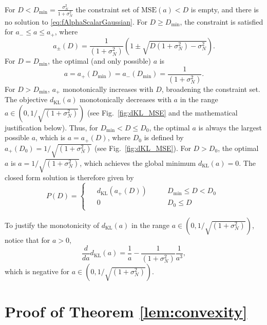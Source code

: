 For $D < D_{\min} = \frac{\sigma_N^2}{1+\sigma_N^2}$ the constraint set of $\text{MSE}(a)<D$ is empty, and there is no solution to \eqref{eq:fAlphaScalarGaussian}. For $D \ge D_{\min}$, the constraint is satisfied for $a_- \le a \le a_+$, where
\begin{equation}\label{eq:constraintSol}
a_{\pm}(D) = \frac{1}{(1 + \sigma_N^2)}\left(1\pm\sqrt{D(1+\sigma_N^2)-\sigma_N^2}\right).
\end{equation}
For $D=D_{\min}$, the optimal (and only possible) $a$ is
\begin{equation}
a = a_+(D_{\min}) = a_-(D_{\min}) =  \frac{1}{(1 + \sigma_N^2)}.
\end{equation}
For $D > D_{\min}$, $a_+$ monotonically increases with $D$, broadening the constraint set. The objective $d_{\text{KL}}(a)$ monotonically decreases with $a$ in the range $a \in (0,1/\sqrt{(1+\sigma_N^2)})$ (see Fig.~\ref{fig:dKL_MSE} and the mathematical justification below). Thus, for $D_{\min} < D \le D_0$, the optimal $a$ is always the largest possible $a$, which is $a=a_+(D)$, where $D_0$ is defined by $a_+(D_0) = 1/\sqrt{(1+\sigma_N^2)}$ (see Fig.~\ref{fig:dKL_MSE}).
For $D>D_0$, the optimal $a$ is $a=1/\sqrt{(1+\sigma_N^2)}$, which achieves the global minimum $d_{\text{KL}}(a)=0$. The closed form solution is therefore given by
\begin{equation}
P(D) =\begin{cases}
\begin{aligned}
&d_{\text{KL}}(a_+(D)) \quad \quad &D_{\min} \le D < D_0\\
&0 &D_0 \le D
\end{aligned}
\end{cases}
\end{equation}

To justify the monotonicity of $d_{\text{KL}}(a)$ in the range $a \in (0,1/\sqrt{(1+\sigma_N^2)})$, notice that for $a > 0$,
\begin{equation}
\frac{d}{da} d_{\text{KL}}(a) = \frac{1}{a} - \frac{1}{(1 + \sigma_N^2)} \frac{1}{a^3},
\end{equation}
which is negative for $a \in (0,1/\sqrt{(1+\sigma_N^2)})$.


\section{Proof of Theorem \ref{lem:convexity}}\label{ap:convexityProof}


